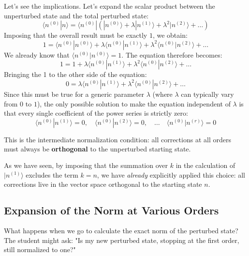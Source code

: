 Let's see the implications. Let's expand the scalar product between the unperturbed state and the total perturbed state:
\begin{equation}
\langle n^{(0)} | n \rangle = \langle n^{(0)} | \left( |n^{(0)}\rangle + \lambda |n^{(1)}\rangle + \lambda^2 |n^{(2)}\rangle + \dots \right)
\end{equation}
Imposing that the overall result must be exactly $1$, we obtain:
\begin{equation}
1 = \langle n^{(0)} | n^{(0)} \rangle + \lambda \langle n^{(0)} | n^{(1)} \rangle + \lambda^2 \langle n^{(0)} | n^{(2)}\rangle + \dots
\end{equation}
We already know that $\langle n^{(0)} \vert{} n^{(0)} \rangle = 1$. The equation therefore becomes:
\begin{equation}
1 = 1 + \lambda \langle n^{(0)} | n^{(1)} \rangle + \lambda^2 \langle n^{(0)} | n^{(2)}\rangle + \dots
\end{equation}
Bringing the 1 to the other side of the equation:
\begin{equation}
0 = \lambda \langle n^{(0)} | n^{(1)} \rangle + \lambda^2 \langle n^{(0)} | n^{(2)}\rangle + \dots
\end{equation}
Since this must be true for a generic parameter $\lambda$ (where $\lambda$ can typically vary from $0$ to $1$), the only possible solution to make the equation independent of $\lambda$ is that every single coefficient of the power series is strictly zero:
\begin{equation}
\langle n^{(0)} | n^{(1)} \rangle = 0, \quad \langle n^{(0)} | n^{(2)} \rangle = 0, \quad \dots \quad \langle n^{(0)} | n^{(r)} \rangle = 0
\end{equation}

This is the intermediate normalization condition: all corrections at all orders must always be \textbf{orthogonal} to the unperturbed starting state.

As we have seen, by imposing that the summation over $k$ in the calculation of $\vert{}n^{(1)}\rangle$ excludes the term $k=n$, we have \textit{already} explicitly applied this choice: all corrections live in the vector space orthogonal to the starting state $n$.

\subsection{Expansion of the Norm at Various Orders}
What happens when we go to calculate the exact norm of the perturbed state? The student might ask: "Is my new perturbed state, stopping at the first order, still normalized to one?"

